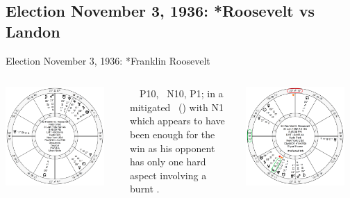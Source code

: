 \subsection{Election November 3, 1936: *Roosevelt vs Landon}
\begin{frame}[t]{Election November 3, 1936: *Franklin Roosevelt}
\small

\begin{columns}[T, onlytextwidth]
\vspace{-1em}
{\includegraphics[width=0.9\textwidth]{charts/FDR.png}}
\fontsize{7pt}{8pt}\selectfont

\Jupiter\, \Trine\, P10, \Sextile\, N10, P1; in a mitigated \Quincunx\, (\Opposition) with N1 which appears to have been enough for the win as his opponent has only one hard aspect involving a burnt \Mercury.

\vspace{-1em}
{\includegraphics[width=0.9\textwidth]{charts/FDR-Prof-7th.png}}


\end{columns}
\end{frame}
